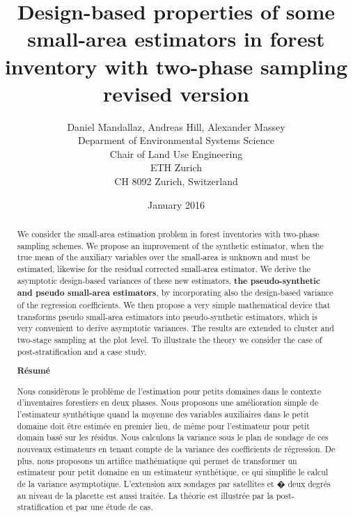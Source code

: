 \documentclass[a4paper,12pt,leqno, titlepage]{article}
\begin{document}
\doublespacing
\nolinenumbers
\pagestyle{empty}

\title{Design-based properties of some small-area estimators in forest inventory with two-phase sampling \\ \small{revised version}}
\author{Daniel Mandallaz, Andreas Hill, Alexander Massey \\Deparment of Environmental Systems Science \\Chair of Land Use Engineering\\ETH Zurich\\CH 8092 Zurich, Switzerland}
\date{January 2016}

\maketitle
\newpage
$ $
\newpage
\begin{abstract}
We consider the small-area estimation problem in forest inventories with two-phase sampling schemes. We propose an improvement of the synthetic estimator, when the true mean of the auxiliary variables over the small-area is unknown and must be estimated, likewise for the residual corrected small-area estimator. We derive the asymptotic design-based variances of these new estimators, \textbf{the pseudo-synthetic and pseudo small-area estimators}, by incorporating also the design-based variance of the regression coefficients. We then propose a very simple mathematical device that transforms pseudo small-area estimators into pseudo-synthetic estimators, which is very convenient to derive asymptotic variances. The results are extended to cluster and two-stage sampling at the plot level. To illustrate the theory we consider the case of post-stratification and a case study.
\begin{center}
\textbf{R\'{e}sum\'{e}}
\end{center}
\begin{sloppypar}
Nous consid\`{e}rons le probl\`{e}me de l'estimation pour petits domaines dans le contexte d'inventaires forestiers en deux phases. Nous proposons une am\'{e}lioration simple de l'estimateur synth\'{e}tique quand la moyenne des variables auxiliaires dans le petit domaine doit \^{e}tre estim\'{e}e en premier lieu, de m\^{e}me pour l'estimateur pour petit domain bas\'{e} sur les r\'{e}sidus. Nous calculons la variance sous le plan de sondage de ces nouveaux estimateurs  en tenant compte de la variance des coefficients de r\'{e}gression.  De plus, nous proposons un artifice math\'{e}matique qui permet de transformer un estimateur pour petit domaine en un estimateur synth\'{e}tique, ce qui simplifie le calcul de la variance asymptotique. L'extension aux sondages par satellites et � deux degr\'{e}s au niveau de la placette est aussi trait\'{e}e. La th\'{e}orie est illustr\'{e}e par la post-stratification et par une \'{e}tude de cas.
\end{sloppypar}
\end{abstract}
\clearpage
\end{document}
